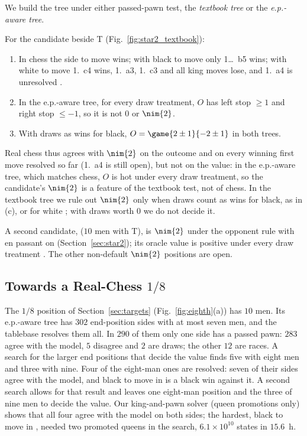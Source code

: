 We build the tree under either passed-pawn test, the \emph{textbook tree} or the \emph{e.p.-aware tree}.

\begin{theorem}\label{thm:oracle-cand}
For the candidate  beside T (Fig.~\ref{fig:star2_textbook}):
\begin{enumerate}
\item[(a)] In chess the side to move wins; with black to move only 1\ldots~b5 wins; with white to
  move 1.~c4 wins, 1.~a3, 1.~c3 and all king moves lose, and 1.~a4 is unresolved .
\item[(b)] In the e.p.-aware tree, for every draw treatment, $O$ has left stop $\ge1$ and right stop $\le-1$, so
  it is not $0$ or $\nim{2}$.
\item[(c)] With draws as wins for black, $O=\game{2\pm1}{-2\pm1}$ in both trees.
\end{enumerate}
\end{theorem}

Real chess thus agrees with $\nim{2}$ on the outcome and on every winning first move resolved so far
(1.~a4 is still open), but not on the value: in the e.p.-aware tree, which matches chess, $O$ is hot under every draw treatment, so
the candidate's $\nim{2}$ is a feature of the textbook test, not of chess. In the textbook tree we rule out
$\nim{2}$ only when draws count as wins for black, as in (c), or for white ; with draws worth $0$ we do
not decide it.

A second candidate,  ($10$ men with T), is $\nim{2}$ under the opponent
rule with en passant on (Section~\ref{sec:star2}); its oracle value is positive under every draw treatment
. The other non-default $\nim{2}$ positions are open.

\subsection{Towards a Real-Chess \texorpdfstring{$1/8$}{1/8}}\label{sec:real-eighth}

The $1/8$ position of Section~\ref{sec:targets} (Fig.~\ref{fig:eighth}(a)) has $10$ men. Its e.p.-aware tree
has $302$ end-position sides with at most seven men, and the tablebase resolves them all. In $290$ of them
only one side has a passed pawn: $283$ agree with the model, $5$ disagree and $2$ are draws; the other $12$ are
races. A search for the larger end positions that decide the value finds five with eight men and three with
nine. Four of the eight-man ones are resolved: seven of their sides agree with the model, and black to move in
 is a black win against it. A second search allows for that result and leaves one
eight-man position and the three of nine men to decide the value. Our king-and-pawn solver (queen promotions
only) shows that all four agree with the model on both sides; the hardest, black to move in
, needed two promoted queens in the search, $6.1\times10^{10}$ states in $15.6$~h.

